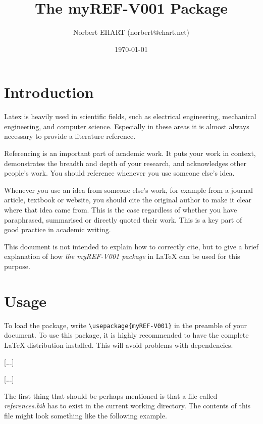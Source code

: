 \documentclass[]{myHOWTO-V001}
\title{The \textbf{myREF-V001} Package}
\author{Norbert EHART (norbert@ehart.net)}
\date{\today}
\begin{document}

\maketitle
\tableofcontents

\section{Introduction}

Latex is heavily used in scientific fields, such as electrical engineering, mechanical engineering, and computer science. Especially in these areas it is almost always necessary to provide a literature reference.

Referencing is an important part of academic work. It puts your work in context, demonstrates the breadth and depth of your research, and acknowledges other people’s work. You should reference whenever you use someone else’s idea. \cite[][]{RefExplained2023}

Whenever you use an idea from someone else's work, for example from a journal article, textbook or website, you should cite the original author to make it clear where that idea came from. This is the case regardless of whether you have paraphrased, summarised or directly quoted their work. This is a key part of good practice in academic writing. \cite[][]{RefExplained2023}

This document is not intended to explain how to correctly cite, but to give a brief explanation of how \emph{the myREF-V001 package} in \LaTeX{} can be used for this purpose.

\section{Usage}

To load the package, write \Verb|\usepackage{myREF-V001}| in the preamble of your document. To use this package, it is highly recommended to have the complete \LaTeX{} distribution installed. This will avoid problems with dependencies.

\begin{mySTY}{}
[...]

\usepackage{myREF-V001}

[...]
\end{mySTY}

The first thing that should be perhaps mentioned is that a file called \emph{references.bib} has to exist in the current working directory. The contents of this file might look something like the following example.
\end{document}
